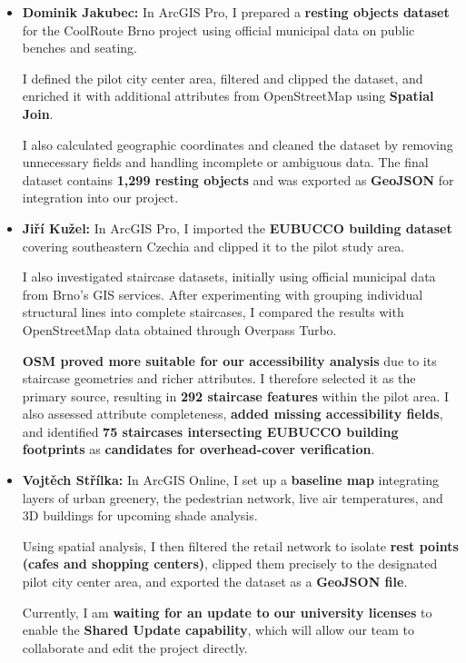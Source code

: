 \documentclass[11pt,a4paper]{article}
\begin{document}
\begin{itemize}
  \item \textbf{Dominik Jakubec:}
  In ArcGIS Pro, I prepared a \textbf{resting objects dataset} for the CoolRoute Brno
  project using official municipal data on public benches and seating.

  I defined the pilot city center area, filtered and clipped the dataset,
  and enriched it with additional attributes from OpenStreetMap using
  \textbf{Spatial Join}.

  I also calculated geographic coordinates and cleaned the dataset
  by removing unnecessary fields and handling incomplete or ambiguous data.
  The final dataset contains \textbf{1,299 resting objects} and was exported
  as \textbf{GeoJSON} for integration into our project.

  \item \textbf{Jiří Kužel:} In ArcGIS Pro, I imported the \textbf{EUBUCCO building
  dataset} covering southeastern Czechia and clipped it to the pilot study
  area.
  
  I also investigated staircase datasets, initially using official municipal
  data from Brno's GIS services. After experimenting with grouping individual
  structural lines into complete staircases, I compared the results with
  OpenStreetMap data obtained through Overpass Turbo.
  
  \textbf{OSM proved more suitable for our accessibility analysis} due to its staircase
  geometries and richer attributes. I therefore selected it as the primary
  source, resulting in \textbf{292 staircase features} within the pilot area. I also
  assessed attribute completeness, \textbf{added missing accessibility fields},
  and identified \textbf{75 staircases intersecting EUBUCCO building footprints}
  as \textbf{candidates for overhead-cover verification}.

  \item \textbf{Vojtěch Střílka:} In ArcGIS Online, I set up a \textbf{baseline map}
  integrating layers of urban greenery, the pedestrian network, live air
  temperatures, and 3D buildings for upcoming shade analysis.

  Using spatial analysis, I then filtered the retail network to isolate
  \textbf{rest points (cafes and shopping centers)}, clipped them precisely to
  the designated pilot city center area, and exported the dataset as
  a \textbf{GeoJSON file}.

  Currently, I am \textbf{waiting for an update to our university licenses}
  to enable the \textbf{Shared Update capability}, which will allow our team
  to collaborate and edit the project directly.

\end{itemize}
\end{document}
